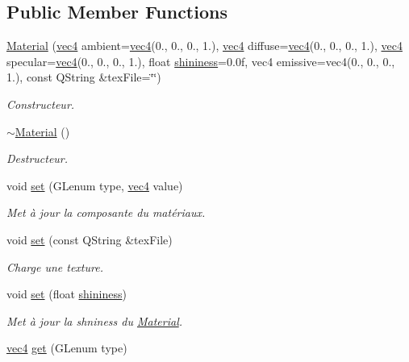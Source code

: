 \subsection*{Public Member Functions}
\begin{DoxyCompactItemize}
\item 
\hyperlink{class_material_a0a67c5d6335d0030d439d16280e7f6ff}{Material} (\hyperlink{structvec4}{vec4} ambient=\hyperlink{structvec4}{vec4}(0., 0., 0., 1.), \hyperlink{structvec4}{vec4} diffuse=\hyperlink{structvec4}{vec4}(0., 0., 0., 1.), \hyperlink{structvec4}{vec4} specular=\hyperlink{structvec4}{vec4}(0., 0., 0., 1.), float \hyperlink{class_material_a9a938aa96f0d5a5dc4d17d43cfd4b42b}{shininess}=0.\+0f, vec4 emissive=vec4(0., 0., 0., 1.), const Q\+String \&tex\+File=\char`\"{}\char`\"{})
\begin{DoxyCompactList}\small\item\em Constructeur. \end{DoxyCompactList}\item 
\hyperlink{class_material_a2c19452d71f54075df8f5405b03129f4}{$\sim$\+Material} ()
\begin{DoxyCompactList}\small\item\em Destructeur. \end{DoxyCompactList}\item 
void \hyperlink{class_material_a2ab92e03d9c90294cd28fff9b6a8cde0}{set} (G\+Lenum type, \hyperlink{structvec4}{vec4} value)
\begin{DoxyCompactList}\small\item\em Met à jour la composante du matériaux. \end{DoxyCompactList}\item 
void \hyperlink{class_material_a8d214d9967f8526ccc6048e6f323bdd5}{set} (const Q\+String \&tex\+File)
\begin{DoxyCompactList}\small\item\em Charge une texture. \end{DoxyCompactList}\item 
void \hyperlink{class_material_a3de47a95f13dc6f6306493516814762c}{set} (float \hyperlink{class_material_a9a938aa96f0d5a5dc4d17d43cfd4b42b}{shininess})
\begin{DoxyCompactList}\small\item\em Met à jour la shniness du \hyperlink{class_material}{Material}. \end{DoxyCompactList}\item 
\hyperlink{structvec4}{vec4} \hyperlink{class_material_a87434a8797bb6e758d764a4d7350ac38}{get} (G\+Lenum type)

\end{DoxyCompactItemize}
